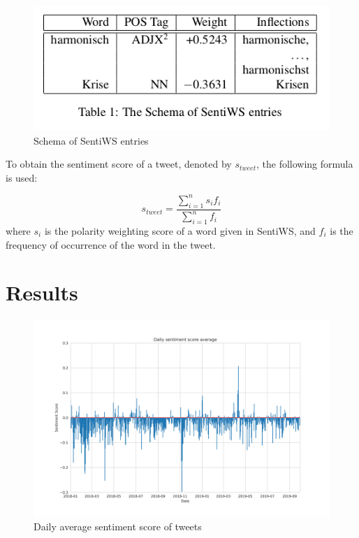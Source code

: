 \documentclass[9pt,twocolumn,twoside,lineno]{pnas-new}
\begin{document}
\begin{figure} 
	\begin{center}
		\includegraphics[width=\linewidth]{figures/sentiws_example}
	\end{center}
	\caption{Schema of SentiWS entries}
	\label{fig:sentiws_example}
\end{figure}

To obtain the sentiment score of a tweet, denoted by \(s_{tweet}\), the following formula is used: 

\begin{equation}
\label{eq:word_score}
s_{tweet} = \frac{\sum_{i=1}^{n} s_i f_i}{\sum_{i=1}^{n} f_i}
\end{equation} 
where \(s_i\) is the polarity weighting score of a word given in SentiWS, and \(f_i\) is the frequency of occurrence of the word in the tweet. 



\section*{Results}

\begin{figure} 
	\begin{center}
		\includegraphics[width=\linewidth]{figures/dailyavgsenti}
	\end{center}
	\caption{Daily average sentiment score of tweets}
	\label{fig:tweet_score}
\end{figure}
\end{document}
